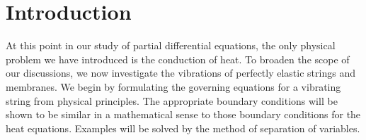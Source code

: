 \section{Introduction}
\label{sec:wave-intro}

At this point in our study of partial differential equations, the only physical problem we have introduced is the conduction of heat.  To broaden the scope of our discussions, we now investigate the vibrations of perfectly elastic strings and membranes.  We begin by formulating the governing equations for a vibrating string from physical principles.  The appropriate boundary conditions will be shown to be similar in a mathematical sense to those boundary conditions for the heat equations.  Examples will be solved by the method of separation of variables.
